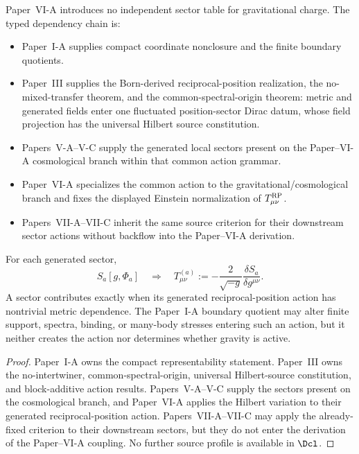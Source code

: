 \documentclass[12pt,a4paper]{article}
\begin{document}
\begin{corollary}
\label{p8:cor:sector-source-status-paper3-import}
Paper~VI-A introduces no independent sector table for gravitational charge.
The typed dependency chain is:
\begin{itemize}
\item Paper~I-A supplies compact coordinate nonclosure and the finite boundary quotients.
\item Paper~III supplies the Born-derived reciprocal-position realization, the no-mixed-transfer theorem, and the common-spectral-origin theorem: metric and generated fields enter one fluctuated position-sector Dirac datum, whose field projection has the universal Hilbert source constitution.
\item Papers~V-A--V-C supply the generated local sectors present on the Paper--VI-A cosmological branch within that common action grammar.
\item Paper~VI-A specializes the common action to the gravitational/cosmological branch and fixes the displayed Einstein normalization of \(T^{\rm RP}_{\mu\nu}\).
\item Papers~VII-A--VII-C inherit the same source criterion for their downstream sector actions without backflow into the Paper--VI-A derivation.
\end{itemize}
For each generated sector,
\[
  S_a[g,\Phi_a]
  \quad\Longrightarrow\quad
  T^{(a)}_{\mu\nu}
  :=
  -\frac{2}{\sqrt{-g}}
  \frac{\delta S_a}{\delta g^{\mu\nu}}.
\]
A sector contributes exactly when its generated reciprocal-position action has
nontrivial metric dependence.  The Paper~I-A boundary quotient may alter finite
support, spectra, binding, or many-body stresses entering such an action, but
it neither creates the action nor determines whether gravity is active.
\end{corollary}

\begin{proof}
Paper~I-A owns the compact representability statement.  Paper~III owns the
no-intertwiner, common-spectral-origin, universal Hilbert-source constitution,
and block-additive action results.  Papers~V-A--V-C supply the
sectors present on the cosmological branch, and Paper~VI-A applies the Hilbert
variation to their generated reciprocal-position action.  Papers~VII-A--VII-C may
apply the already-fixed criterion to their downstream sectors, but they do not
enter the derivation of the Paper--VI-A coupling.  No further source profile is
available in \(\Dcl\).
\end{proof}
\end{document}
